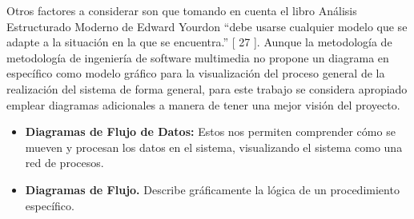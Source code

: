 Otros factores a considerar son que tomando en cuenta el libro Análisis Estructurado Moderno de Edward Yourdon “debe usarse cualquier modelo que se adapte a la situación en la que se encuentra.” [ 27 ]. Aunque la metodología de metodología de ingeniería de software multimedia no propone un diagrama en específico como modelo gráfico para la visualización del proceso general de la realización del sistema de forma general, para este trabajo se considera apropiado emplear diagramas adicionales a manera de tener una mejor visión del proyecto.\\
\begin{itemize}
\item \textbf{Diagramas de Flujo de Datos:}  Estos nos permiten comprender cómo se mueven y procesan los datos en el sistema, visualizando el sistema como una red de procesos.
\item \textbf{Diagramas de Flujo.} Describe gráficamente la lógica de un procedimiento específico.
\end{itemize}

